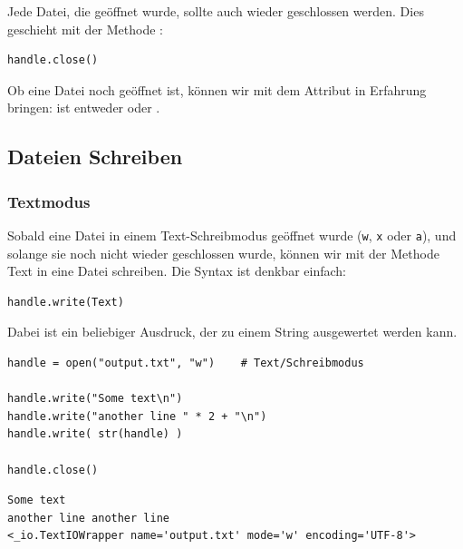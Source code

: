 Jede Datei, die geöffnet wurde, sollte auch wieder geschlossen werden. Dies geschieht mit der Methode :
\begin{codebox}
\begin{verbatim}
handle.close()
\end{verbatim}
\end{codebox}

Ob eine Datei noch geöffnet ist, können wir mit dem Attribut  in Erfahrung bringen:  ist entweder  oder .

\subsection{Dateien Schreiben}
\subsubsection{Textmodus}
Sobald eine Datei in einem Text-Schreibmodus geöffnet wurde (\texttt{w},  \texttt{x} oder \texttt{a}), und solange sie noch nicht wieder geschlossen wurde, können wir mit der Methode  Text in eine Datei schreiben. Die Syntax ist denkbar einfach:

\begin{codebox}
\begin{verbatim}
handle.write(Text)
\end{verbatim}
\end{codebox}

Dabei ist  ein beliebiger Ausdruck, der zu einem String ausgewertet werden kann.

\begin{codebox}
\begin{verbatim}
handle = open("output.txt", "w")    # Text/Schreibmodus

handle.write("Some text\n")
handle.write("another line " * 2 + "\n")
handle.write( str(handle) )

handle.close()
\end{verbatim}
\end{codebox}

\begin{cmdbox}
\begin{verbatim}
Some text
another line another line 
<_io.TextIOWrapper name='output.txt' mode='w' encoding='UTF-8'>
\end{verbatim}
\end{cmdbox}

